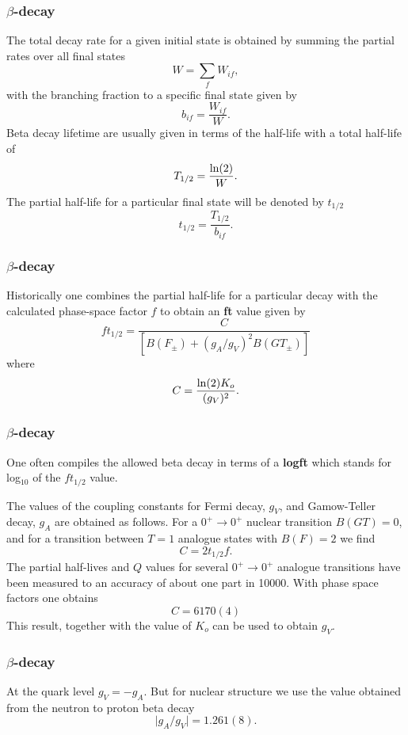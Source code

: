 \documentclass{beamer}
\begin{document}
\begin{frame}
\frametitle{$\beta$-decay}

\begin{block}{}
The total decay rate for a given
initial state is obtained by summing the partial rates over all
final states
\[
W = \displaystyle\sum _{f} W_{if}, 
\]
with the branching fraction to a specific final state given by
\[
b_{if} = \frac{W_{if}}{W}.  
\]
Beta decay lifetime are usually given in terms of the half-life with
a total half-life of
\[
T_{1/2} = \frac{{\rm ln}(2)}{W}.
\]
The partial half-life for a particular final state will be
denoted by $t_{1/2}$
\[
t_{1/2} = \frac{T_{1/2}}{b_{if}}. 
\]
\end{block}
\end{frame}

\begin{frame}
\frametitle{$\beta$-decay}

\begin{block}{}
Historically
one combines the partial half-life for a particular decay
with the calculated
phase-space factor $f$ to obtain  an \textbf{ft} value given by
\[
  f t_{1/2}=\frac{C }{\left[B(F_{\pm})+(g_{A}/g_{V})^{2} B(GT_{\pm}) \right] }  
\]
where
\[
  C = \frac{{\rm ln}(2)K_{o}}{(g_{V})^{2}}. 
\]
\end{block}
\end{frame}

\begin{frame}
\frametitle{$\beta$-decay}

\begin{block}{}
One often compiles the allowed beta decay in terms of a \textbf{logft}
which stands for log$_{10}$ of the $ft_{1/2}$ value.

     The values of the coupling constants for Fermi decay,
$g_{V}$, and Gamow-Teller decay, $g_{A}$ are obtained as follows.
For a $0^{+} \rightarrow  0^{+}$ nuclear transition $B(GT)=0$, and for a
transition between $T=1$ analogue states with $B(F)=2$ we find 
\[
       C = 2 t_{1/2} f.  
\]
The partial half-lives and $Q$ values for several $0^{+} \rightarrow  0^{+}$ analogue
transitions have been measured to an accuracy of about one part in
10000. With  phase space factors one obtains 
\[
      C = 6170(4)    
\]
This result, together with the value of $K_{o}$ can be used to obtain $g_{V}$.
\end{block}
\end{frame}

\begin{frame}
\frametitle{$\beta$-decay}

\begin{block}{}
At the quark level $g_{V}=-g_{A}$.
But for nuclear structure we use the value obtained from the
neutron to proton beta decay
\[
     \vert g_{A}/g_{V}\vert  = 1.261(8). 
\]
\end{block}
\end{frame}
\end{document}
